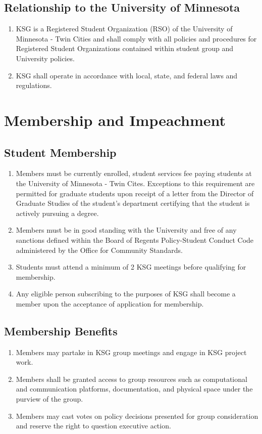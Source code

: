 \documentclass[12pt,executivepaper]{article}
\begin{document}
\subsection{Relationship to the University of Minnesota}
\begin{enumerate}
    \item KSG is a Registered Student Organization (RSO) of the University of Minnesota -
          Twin Cities and shall comply with all policies and procedures for Registered
          Student Organizations contained within student group and University policies.
    \item KSG shall operate in accordance with local, state, and federal laws and
          regulations.
\end{enumerate}

\section{Membership and Impeachment}

\subsection{Student Membership}
\begin{enumerate}
    \item Members must be currently enrolled, student services fee paying students at the
          University of Minnesota - Twin Cites. Exceptions to this requirement are permitted
          for graduate students upon receipt of a letter from the Director of Graduate Studies
          of the student's department certifying that the student is actively pursuing a degree.
    \item Members must be in good standing with the University and free of any sanctions defined
          within the Board of Regents Policy-Student Conduct Code administered by the Office
          for Community Standards.
    \item Students must attend a minimum of 2 KSG meetings before qualifying for
          membership.
    \item Any eligible person subscribing to the purposes of KSG shall become a
          member upon the acceptance of application for membership.
\end{enumerate}

\subsection{Membership Benefits}
\begin{enumerate}
    \item Members may partake in KSG group meetings and engage in KSG project work.
    \item Members shall be granted access to group resources such as computational
          and communication platforms, documentation, and physical space under the
          purview of the group.
    \item Members may cast votes on policy decisions presented for group consideration
          and reserve the right to question executive action.
\end{enumerate}
\end{document}
